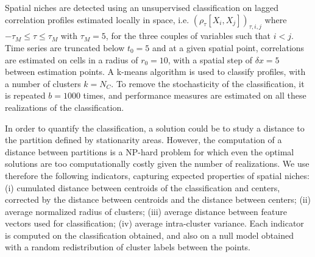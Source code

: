 \documentclass[fleqn,10pt]{wlscirep}
\begin{document}
Spatial niches are detected using an unsupervised classification on lagged correlation profiles estimated locally in space, i.e. $(\rho_{\tau}\left[X_i,X_j\right])_{\tau,i,j}$ where $- \tau_M \leq \tau \leq  \tau_M$ with $\tau_M = 5$, for the three couples of variables such that $i < j$. Time series are truncated below $t_0 = 5$ and at a given spatial point, correlations are estimated on cells in a radius of  $r_0 = 10$, with a spatial step of $\delta x = 5$ between estimation points. A k-means algorithm is used to classify profiles, with a number of clusters $k = N_C$. To remove the stochasticity of the classification, it is repeated $b = 1000$ times, and performance measures are estimated on all these realizations of the classification.


In order to quantify the classification, a solution could be to study a distance to the partition defined by stationarity areas. However, the computation of a distance between partitions is a NP-hard problem \cite{day1981complexity} for which even the optimal solutions \cite{porumbel2011efficient} are too computationally costly given the number of realizations. We use therefore the following indicators, capturing expected properties of spatial niches: (i) cumulated distance between centroids of the classification and centers, corrected by the distance between centroids and the distance between centers; (ii) average normalized radius of clusters; (iii) average distance between feature vectors used for classification; (iv) average intra-cluster variance. Each indicator is computed on the classification obtained, and also on a null model obtained with a random redistribution of cluster labels between the points.
 
\end{document}

